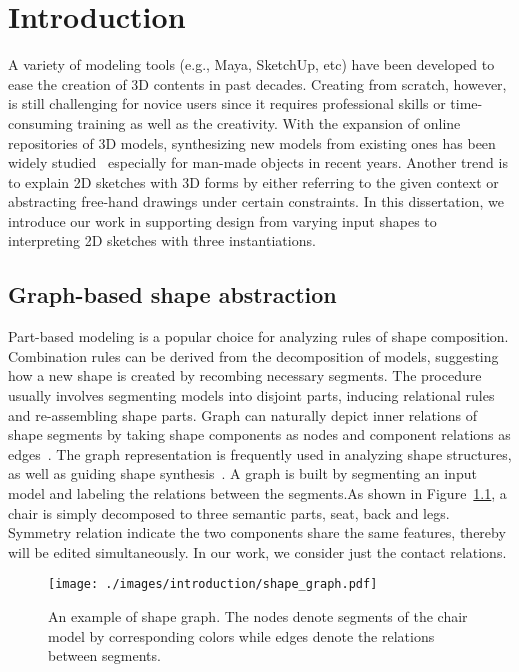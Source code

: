 

\chapter{Introduction}

A variety of modeling tools (e.g., Maya, SketchUp, etc) have been developed to ease the creation of 3D contents in past decades. Creating from scratch, however, is still challenging for novice users since it requires professional skills or time-consuming training as well as the creativity. With the expansion of online repositories of 3D models, synthesizing new models from existing ones has been widely studied~\cite{MitraSTAR2013} especially for man-made objects in recent years. Another trend is to explain 2D sketches with 3D forms by either referring to the given context or abstracting free-hand drawings under certain constraints\cite{Olsen2009}. In this dissertation, we introduce our work in supporting design from varying input shapes to interpreting 2D sketches with three instantiations.

\section{Graph-based shape abstraction}

Part-based modeling is a popular choice for analyzing rules of shape composition. Combination rules can be derived from the decomposition of models, suggesting how a new shape is created by recombing necessary segments. The procedure usually involves segmenting models into disjoint parts, inducing relational rules and re-assembling shape parts. Graph can naturally depict inner relations of shape segments by taking shape components as nodes and component relations as edges~\cite{Zheng:2013}. The graph representation is frequently used in analyzing shape structures, as well as guiding shape synthesis~\cite{topoVarying14}. A graph is built by segmenting an input model and labeling the relations between the segments.As shown in Figure~\ref{fig:intro_shape_graph}, a chair is simply decomposed to three semantic parts, seat, back and legs. Symmetry relation indicate the two components share the same features, thereby will be edited simultaneously. In our work, we consider just the contact relations.

\begin{figure}[t!]
  \texttt{[image: ./images/introduction/shape\_graph.pdf]}
  \caption{An example of shape graph. The nodes denote segments of the chair model by corresponding colors while edges denote the relations between segments.}
  \label{fig:intro_shape_graph}
\end{figure}

